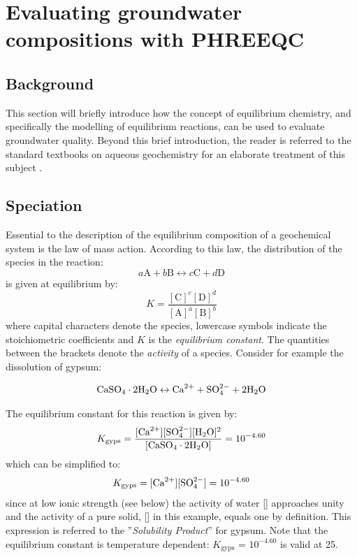 \chapter{Evaluating groundwater compositions with PHREEQC}
\section{Background}

This section will briefly introduce how the concept of equilibrium chemistry, and specifically the modelling of equilibrium reactions, can be used to evaluate groundwater quality. Beyond this brief introduction, the reader is referred to the standard textbooks on aqueous geochemistry for an elaborate treatment of this subject  \citep[e.g.][]{ap2005, stumorg}.

\section{Speciation}

Essential to the description of the equilibrium composition of a geochemical system is the law of mass action. According to this law, the distribution of the species in the reaction:
\begin{equation}
a\text{A} + b\text{B} \leftrightarrow c\text{C} + d\text{D}
\end{equation}
is given at equilibrium by:
\begin{equation}
K = \frac{[\text{C}]^c[\text{D}]^d}{[\text{A}]^a[\text{B}]^b}
\label{eq:massaction}
\end{equation}
where capital characters denote the species, lowercase symbols indicate the stoichiometric coefficients and $K$ is the \textit{equilibrium constant}. The quantities between the brackets denote the \textit{activity} of a species. Consider for example the dissolution of gypsum:

\begin{equation}
\text{CaSO}_{4} \cdot 2 \text{H}_2\text{O} \leftrightarrow \text{Ca}^{2+} + \text{SO}^{2-}_4 + 2\text{H}_2\text{O}
\end{equation}

The equilibrium constant for this reaction is given by:
\begin{equation}
K_\text{gyps} = \frac{[\text{Ca}^{2+}][\text{SO}^{2-}_4][\text{H}_2\text{O}]^2}{[\text{CaSO}_{4} \cdot 2 \text{H}_2\text{O}]} = 10^{-4.60}
\end{equation}
which can be simplified to:
\begin{equation}
K_\text{gyps} = [\text{Ca}^{2+}][\text{SO}^{2-}_4] = 10^{-4.60}
\label{eq:k_gyps}
\end{equation}
since at low ionic strength (see below) the activity of water [\wa] approaches unity and the activity of a pure solid, [\gy] in this example, equals one by definition. This expression is referred to the ''\textit{Solubility Product}'' for gypsum. Note that the equilibrium constant is temperature dependent:
$K_\text{gyps}$ = $10^{-4.60}$
is valid at \unit{25}{\celsius}.

